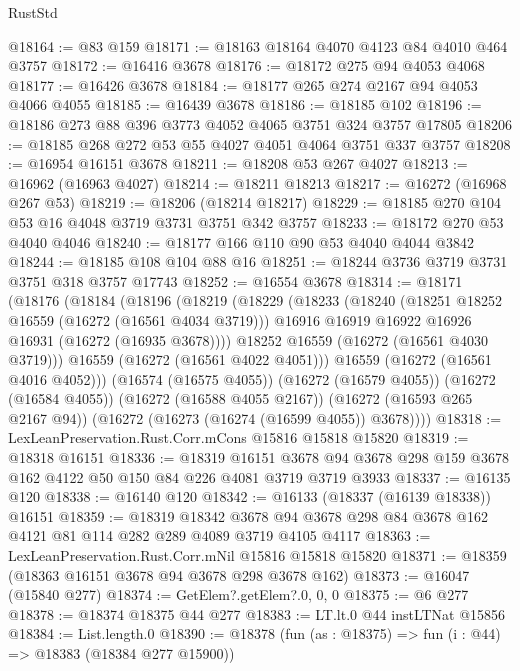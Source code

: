 \begin{lexlean}{RustStd}
\begin{coremodule}
@18164 := @83 @159
@18171 := @18163 @18164 @4070 @4123 @84 @4010 @464 @3757
@18172 := @16416 @3678
@18176 := @18172 @275 @94 @4053 @4068
@18177 := @16426 @3678
@18184 := @18177 @265 @274 @2167 @94 @4053 @4066 @4055
@18185 := @16439 @3678
@18186 := @18185 @102
@18196 := @18186 @273 @88 @396 @3773 @4052 @4065 @3751 @324 @3757 @17805
@18206 := @18185 @268 @272 @53 @55 @4027 @4051 @4064 @3751 @337 @3757
@18208 := @16954 @16151 @3678
@18211 := @18208 @53 @267 @4027
@18213 := @16962 (@16963 @4027)
@18214 := @18211 @18213
@18217 := @16272 (@16968 @267 @53)
@18219 := @18206 (@18214 @18217)
@18229 := @18185 @270 @104 @53 @16 @4048 @3719 @3731 @3751 @342 @3757
@18233 := @18172 @270 @53 @4040 @4046
@18240 := @18177 @166 @110 @90 @53 @4040 @4044 @3842
@18244 := @18185 @108 @104 @88 @16
@18251 := @18244 @3736 @3719 @3731 @3751 @318 @3757 @17743
@18252 := @16554 @3678
@18314 := @18171
    (@18176
      (@18184
        (@18196
          (@18219
            (@18229
              (@18233
                (@18240
                  (@18251 @18252 @16559 (@16272 (@16561 @4034 @3719)))
                  @16916
                  @16919
                  @16922
                  @16926
                  @16931
                  (@16272 (@16935 @3678))))
              @18252
              @16559
              (@16272 (@16561 @4030 @3719)))
            @16559
            (@16272 (@16561 @4022 @4051)))
          @16559
          (@16272 (@16561 @4016 @4052)))
        (@16574 (@16575 @4055))
        (@16272 (@16579 @4055))
        (@16272 (@16584 @4055))
        (@16272 (@16588 @4055 @2167))
        (@16272 (@16593 @265 @2167 @94))
        (@16272 (@16273 (@16274 (@16599 @4055)) @3678))))
@18318 := LexLeanPreservation.Rust.Corr.mCons @15816 @15818 @15820
@18319 := @18318 @16151
@18336 := @18319
    @16151
    @3678
    @94
    @3678
    @298
    @159
    @3678
    @162
    @4122
    @50
    @150
    @84
    @226
    @4081
    @3719
    @3719
    @3933
@18337 := @16135 @120
@18338 := @16140 @120
@18342 := @16133 (@18337 (@16139 @18338)) @16151
@18359 := @18319
    @18342
    @3678
    @94
    @3678
    @298
    @84
    @3678
    @162
    @4121
    @81
    @114
    @282
    @289
    @4089
    @3719
    @4105
    @4117
@18363 := LexLeanPreservation.Rust.Corr.mNil @15816 @15818 @15820
@18371 := @18359 (@18363 @16151 @3678 @94 @3678 @298 @3678 @162)
@18373 := @16047 (@15840 @277)
@18374 := GetElem?.getElem?.{0, 0, 0}
@18375 := @6 @277
@18378 := @18374 @18375 @44 @277
@18383 := LT.lt.{0} @44 instLTNat @15856
@18384 := List.length.{0}
@18390 := @18378 (fun (as : @18375) => fun (i : @44) => @18383 (@18384 @277 @15900))

\end{coremodule}
\end{lexlean}
